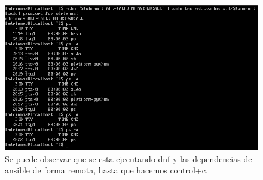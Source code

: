 \begin{figure}[H]
	\centering
	\includegraphics[scale=0.5]{graphics/img19.png}
	\caption{Se puede observar que se esta ejecutando dnf y las dependencias de ansible de forma remota, hasta que hacemos control+c.}
\end{figure}



\newpage


